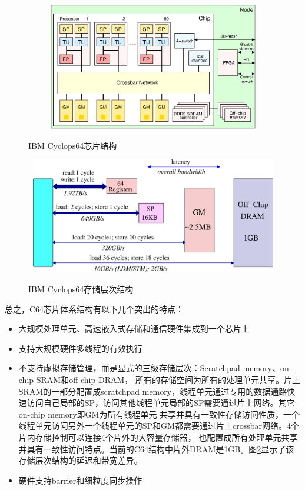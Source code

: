 \begin{flushleft}
\begin{figure}[htbp]
	\centering
	\includegraphics[width=5in,height=2.2in]{Img/Chap_Algorithm/c64node}\\
	\caption{IBM Cyclops64芯片结构}\label{fig:c64node}
\end{figure}
\begin{figure}[htbp]
	\centering
	\includegraphics[width=5in,height=2in]{Img/Chap_Algorithm/c64-memory}\\
	\caption{IBM Cyclops64存储层次结构}\label{fig:c64-memory}
\end{figure}
总之，C64芯片体系结构有以下几个突出的特点：
\begin{itemize}
	\item 大规模处理单元、高速嵌入式存储和通信硬件集成到一个芯片上
	\item 支持大规模硬件多线程的有效执行
	\item 不支持虚拟存储管理，而是显式的三级存储层次：Scratchpad memory、on-chip SRAM和off-chip DRAM，
	所有的存储空间为所有的处理单元共享。片上SRAM的一部分配置成scratchpad
	memory，线程单元通过专用的数据通路快速访问自己局部的SP，访问其他线程单元局部的SP需要通过片上网络。其它on-chip
	memory即GM为所有线程单元
	共享并具有一致性存储访问性质，一个线程单元访问另外一个线程单元的SP和GM都需要通过片上crossbar网络。4个片内存储控制可以连接4个片外的大容量存储器，
	也配置成所有处理单元共享并具有一致性访问特点。当前的C64结构中片外DRAM是1GB。图\ref{fig:c64-memory}显示了该存储层次结构的延迟和带宽差异。
	\item 硬件支持barrier和细粒度同步操作
\end{itemize}


\end{flushleft}
